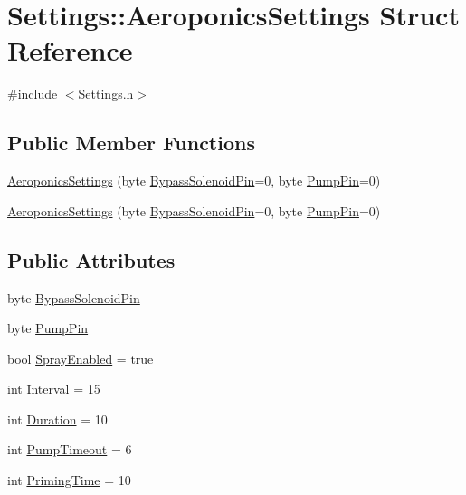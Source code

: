 \hypertarget{struct_settings_1_1_aeroponics_settings}{}\section{Settings\+:\+:Aeroponics\+Settings Struct Reference}
\label{struct_settings_1_1_aeroponics_settings}


{\ttfamily \#include $<$Settings.\+h$>$}

\subsection*{Public Member Functions}
\begin{DoxyCompactItemize}
\item 
\hyperlink{struct_settings_1_1_aeroponics_settings_af8d53957872ba4462cdd76db1f6f37f5}{Aeroponics\+Settings} (byte \hyperlink{struct_settings_1_1_aeroponics_settings_af3cf6bd94e33fcce7fdf3f499578fc27}{Bypass\+Solenoid\+Pin}=0, byte \hyperlink{struct_settings_1_1_aeroponics_settings_a10f474c3e0c19fea646061faa4cb1a9b}{Pump\+Pin}=0)
\item 
\hyperlink{struct_settings_1_1_aeroponics_settings_af8d53957872ba4462cdd76db1f6f37f5}{Aeroponics\+Settings} (byte \hyperlink{struct_settings_1_1_aeroponics_settings_af3cf6bd94e33fcce7fdf3f499578fc27}{Bypass\+Solenoid\+Pin}=0, byte \hyperlink{struct_settings_1_1_aeroponics_settings_a10f474c3e0c19fea646061faa4cb1a9b}{Pump\+Pin}=0)
\end{DoxyCompactItemize}
\subsection*{Public Attributes}
\begin{DoxyCompactItemize}
\item 
byte \hyperlink{struct_settings_1_1_aeroponics_settings_af3cf6bd94e33fcce7fdf3f499578fc27}{Bypass\+Solenoid\+Pin}
\item 
byte \hyperlink{struct_settings_1_1_aeroponics_settings_a10f474c3e0c19fea646061faa4cb1a9b}{Pump\+Pin}
\item 
bool \hyperlink{struct_settings_1_1_aeroponics_settings_a278a7d656d1c9897ce93826285eea2a2}{Spray\+Enabled} = true
\item 
int \hyperlink{struct_settings_1_1_aeroponics_settings_a2b9e3919c231cfaaf772712a840b25d2}{Interval} = 15
\item 
int \hyperlink{struct_settings_1_1_aeroponics_settings_ab40a654c63206266b09278aff65aee0a}{Duration} = 10
\item 
int \hyperlink{struct_settings_1_1_aeroponics_settings_a664103c05b97c1f0c8468b6828f799be}{Pump\+Timeout} = 6
\item 
int \hyperlink{struct_settings_1_1_aeroponics_settings_a24f71f0489ab2882619a7308083a62d9}{Priming\+Time} = 10
\end{DoxyCompactItemize}


